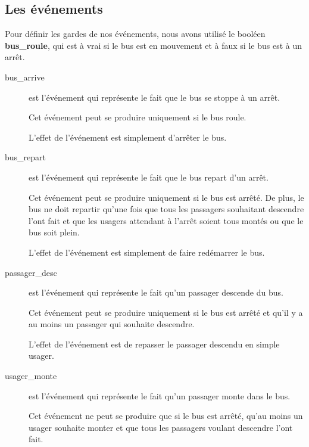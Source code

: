 \documentclass[a4paper,titlepage]{report}
\begin{document}
	\subsection{Les événements}
		Pour définir les gardes de nos événements, nous avons utilisé le booléen \textbf{bus\_roule}, qui est à vrai si le bus est en mouvement et à faux si le bus est à un arrêt.\\
		
		\begin{description}
			\item[bus\_arrive] est l'événement qui représente le fait que le bus se stoppe à un arrêt.
			
			Cet événement peut se produire uniquement si le bus roule. 
			
			L'effet de l'événement est simplement d'arrêter le bus.\\
		
			\item[bus\_repart] est l'événement qui représente le fait que le bus repart d'un arrêt.
			
			Cet événement peut se produire uniquement si le bus est arrêté. De plus, le bus ne doit repartir qu'une fois que tous les passagers souhaitant descendre l'ont fait et que les usagers attendant à l'arrêt soient tous montés ou que le bus soit plein.
			
			L'effet de l'événement est simplement de faire redémarrer le bus.\\
			
			\item[passager\_desc] est l'événement qui représente le fait qu'un passager descende du bus.
			
			Cet événement peut se produire uniquement si le bus est arrêté et qu'il y a au moins un passager qui souhaite descendre.
			
			L'effet de l'événement est de repasser le passager descendu en simple usager. \\
			
			\item[usager\_monte] est l'événement qui représente le fait qu'un passager monte dans le bus.
			
			Cet événement ne peut se produire que si le bus est arrêté, qu'au moins un usager souhaite monter et que tous les passagers voulant descendre l'ont fait.
			

\end{description}
\end{document}
